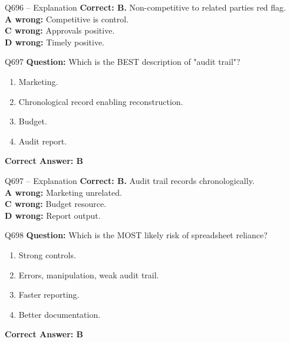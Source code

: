 \documentclass[aspectratio=169,10pt]{beamer}
\begin{document}
	\begin{frame}[t]{Q696 -- Explanation}
		\small
		\textbf{Correct: B.} Non-competitive to related parties red flag. \\[4pt]
		\textbf{A wrong:} Competitive is control. \\[2pt]
		\textbf{C wrong:} Approvals positive. \\[2pt]
		\textbf{D wrong:} Timely positive.
	\end{frame}
	
	\begin{frame}[t]{Q697}
		\small
		\textbf{Question:} Which is the BEST description of "audit trail"?
		\begin{enumerate}[label=\Alph*.,itemsep=1pt,topsep=2pt]
			\item Marketing.
			\item Chronological record enabling reconstruction.
			\item Budget.
			\item Audit report.
		\end{enumerate}
		\vspace{4pt}
		\textbf{Correct Answer: B}
	\end{frame}
	
	\begin{frame}[t]{Q697 -- Explanation}
		\small
		\textbf{Correct: B.} Audit trail records chronologically. \\[4pt]
		\textbf{A wrong:} Marketing unrelated. \\[2pt]
		\textbf{C wrong:} Budget resource. \\[2pt]
		\textbf{D wrong:} Report output.
	\end{frame}
	
	\begin{frame}[t]{Q698}
		\small
		\textbf{Question:} Which is the MOST likely risk of spreadsheet reliance?
		\begin{enumerate}[label=\Alph*.,itemsep=1pt,topsep=2pt]
			\item Strong controls.
			\item Errors, manipulation, weak audit trail.
			\item Faster reporting.
			\item Better documentation.
		\end{enumerate}
		\vspace{4pt}
		\textbf{Correct Answer: B}
	\end{frame}
	
\end{document}
